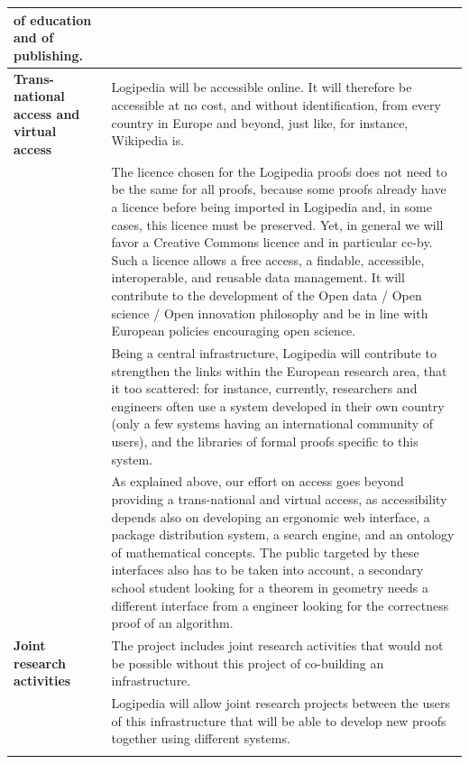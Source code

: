 \begin{longtable}{|p{}|p{}|}
of education and of publishing.\\
\hline
{\bf Trans-national access and virtual access}
&
Logipedia will be accessible online. It will therefore be accessible
at no cost, and without identification, from every country in Europe
and beyond, just like, for instance, Wikipedia is.\\
&
\hspace{0.4cm} The licence chosen for the Logipedia proofs does not
need to be the same for all proofs, because some proofs already have a
licence before being imported in Logipedia and, in some cases, this
licence must be preserved.  Yet, in general we will favor a Creative
Commons licence and in particular cc-by.  Such a licence allows a free
access, a findable, accessible, interoperable, and reusable data
management. It will contribute to the development of the Open data /
Open science / Open innovation philosophy and be in line with European
policies encouraging open science.
\\
&
\hspace{0.4cm} Being a central infrastructure, Logipedia will
contribute to strengthen the links within the European research area,
that it too scattered: for instance, currently, researchers and
engineers often use a system developed in their own country (only a
few systems having an international community of users), and the
libraries of formal proofs specific to this system.
\\
&
\hspace{0.4cm}
As explained above, our effort on access goes beyond providing a
trans-national and virtual access, as accessibility depends also on
developing an ergonomic web interface, a package distribution system,
a search engine, and an ontology of mathematical concepts. The public
targeted by these interfaces also has to be taken into account, a
secondary school student looking for a theorem in geometry needs a
different interface from a engineer looking for the correctness proof
of an algorithm.\\
\hline
{\bf Joint research activities}
&
The project includes joint research activities that would not be possible 
without this project of co-building an infrastructure.
\\
&
\hspace{0.4cm} Logipedia will allow joint research projects between
the users of this infrastructure that will be able to develop new
proofs together using different systems.\\
&
\hspace{0.4cm}

\end{longtable}

